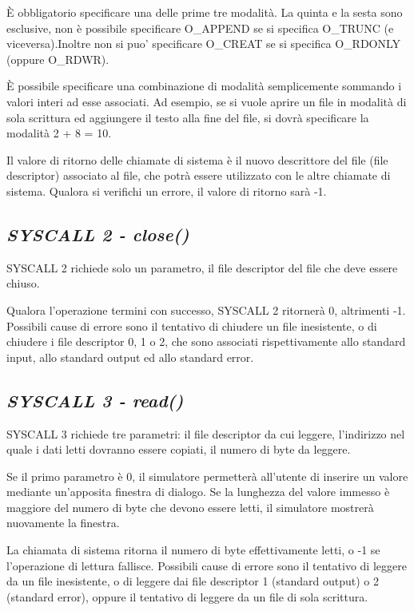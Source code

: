 \documentclass[letterpaper,10pt,english]{sphinxmanual}
\begin{document}
È obbligatorio specificare una delle prime tre modalità. La quinta e
la sesta sono esclusive, non è possibile specificare O\_APPEND se si
specifica O\_TRUNC (e viceversa).Inoltre non si puo' specificare O\_CREAT se
si specifica O\_RDONLY (oppure O\_RDWR).

È possibile specificare una combinazione di modalità semplicemente
sommando i valori interi ad esse associati.  Ad esempio, se si vuole aprire un
file in modalità di sola scrittura ed aggiungere il testo alla fine del
file, si dovrà specificare la modalità 2 + 8 = 10.

Il valore di ritorno delle chiamate di sistema è il nuovo descrittore del
file (file descriptor) associato al file, che potrà essere utilizzato con
le altre chiamate di sistema. Qualora si verifichi un errore, il valore di
ritorno sarà -1.


\subsection{\emph{SYSCALL 2 - close()}}
\label{instructions:syscall-2-close}
SYSCALL 2 richiede solo un parametro, il file descriptor del file che deve
essere chiuso.

Qualora l'operazione termini con successo, SYSCALL 2 ritornerà 0, altrimenti
-1.  Possibili cause di errore sono il tentativo di chiudere un file
inesistente, o di chiudere i file descriptor 0, 1 o 2, che sono associati
rispettivamente allo standard input, allo standard output ed allo standard
error.


\subsection{\emph{SYSCALL 3 - read()}}
\label{instructions:syscall-3-read}
SYSCALL 3 richiede tre parametri: il file descriptor da cui leggere, l'indirizzo
nel quale i dati letti dovranno essere copiati, il numero di byte da leggere.

Se il primo parametro è 0, il simulatore permetterà all'utente di
inserire un valore mediante un'apposita finestra di dialogo.  Se la lunghezza
del valore immesso è maggiore del numero di byte che devono essere letti,
il simulatore mostrerà nuovamente la finestra.

La chiamata di sistema ritorna il numero di byte effettivamente letti, o -1 se
l'operazione di lettura fallisce. Possibili cause di errore sono il tentativo
di leggere da un file inesistente, o di leggere dai file descriptor 1
(standard output) o 2 (standard error), oppure il tentativo di leggere da un
file di sola scrittura.
\end{document}
